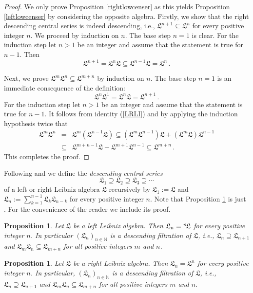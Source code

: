 \documentclass{amsart}
\newtheorem{pro}[thm]{Proposition}
\numberwithin{equation}{section}
\newcommand{\N}{\mathbb{N}}
\newcommand{\lf}{\mathfrak{L}}
\begin{document}
\begin{proof}
We only prove Proposition \ref{rightlowcenser} as this yields Proposition \ref{leftlowcenser}
by considering the opposite algebra. Firstly, we show that the right descending central series
is indeed descending, i.e., $\lf^{n+1}\subseteq\lf^n$ for every positive integer $n$. We
proceed by induction on $n$. The base step $n=1$ is clear. For the induction step let $n>1$
be an integer and assume that the statement is true for $n-1$. Then $$\lf^{n+1}=\lf^n\lf
\subseteq\lf^{n-1}\lf=\lf^n\,.$$

Next, we prove $\lf^m\lf^n\subseteq\lf^{m+n}$ by induction on $n$. The base step $n=1$
is an immediate consequence of the definition: $$\lf^n\lf^1=\lf^n\lf=\lf^{n+1}\,.$$ For the
induction step let $n>1$ be an integer and assume that the statement is true for $n-1$. It
follows from identity (\ref{LRLI}) and by applying the induction hypothesis twice that
\begin{eqnarray*}
\lf^m\lf^n & = & \lf^m(\lf^{n-1}\lf)\subseteq(\lf^m\lf^{n-1})\lf+(\lf^m\lf)\lf^{n-1}\\
& \subseteq & \lf^{m+n-1}\lf+\lf^{m+1}\lf^{n-1}\subseteq\lf^{m+n}\,.
\end{eqnarray*}
This completes the proof.
\end{proof}

Following \cite[p.\ 2]{AO1} and \cite[p. 3829]{P1} we define the {\it descending central series\/}
$$\lf_1\supseteq\lf_2\supseteq\lf_3\supseteq\cdots$$ of a left or right Leibniz algebra $\lf$
recursively by $\lf_1:=\lf$ and $\lf_n:=\sum\limits_{k=1}^{n-1}\lf_k\lf_{n-k}$ for every
positive integer $n$. Note that Proposition \ref{lowcenserright} is just \cite[Lemma 2]{AO1}.
For the convenience of the reader we include its proof.

\begin{pro}\label{lowcenserleft}
Let $\lf$ be a left Leibniz algebra. Then $\lf_n=\hspace{.1mm}^n\hspace{-.5mm}\lf$ for
every positive integer $n$. In particular $(\lf_n)_{n\in\N}$ is a descending filtration of $\lf$,
i.e., $\lf_n\supseteq\lf_{n+1}$ and $\lf_m\lf_n\subseteq\lf_{m+n}$ for all positive integers
$m$ and $n$.
\end{pro}

\begin{pro}\label{lowcenserright}
Let $\lf$ be a right Leibniz algebra. Then $\lf_n=\lf^n$ for every positive integer $n$. In
particular, $(\lf_n)_{n\in\N}$ is a descending filtration of $\lf$, i.e., $\lf_n\supseteq\lf_{n+1}$
and $\lf_m\lf_n\subseteq\lf_{m+n}$ for all positive integers $m$ and $n$.
\end{pro}
\end{document}
